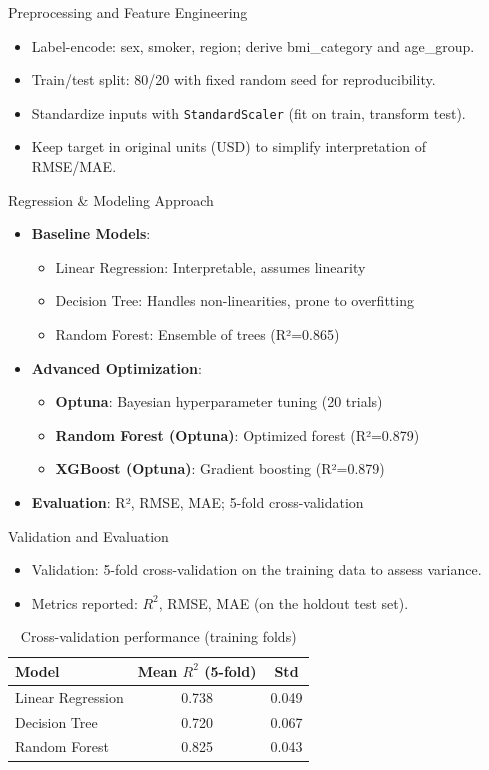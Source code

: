 \documentclass[10pt]{beamer}
\begin{document}
\begin{frame}{Preprocessing and Feature Engineering}
\begin{itemize}
  \item Label-encode: sex, smoker, region; derive bmi\_category and age\_group.
  \item Train/test split: 80/20 with fixed random seed for reproducibility.
  \item Standardize inputs with \texttt{StandardScaler} (fit on train, transform test).
  \item Keep target in original units (USD) to simplify interpretation of RMSE/MAE.
\end{itemize}
\end{frame}

\begin{frame}{Regression \& Modeling Approach}
\begin{itemize}
\item \textbf{Baseline Models}:
  \begin{itemize}
  \item Linear Regression: Interpretable, assumes linearity
  \item Decision Tree: Handles non-linearities, prone to overfitting
  \item Random Forest: Ensemble of trees (R²=0.865)
  \end{itemize}
\item \textbf{Advanced Optimization}:
  \begin{itemize}
  \item \textbf{Optuna}: Bayesian hyperparameter tuning (20 trials)
  \item \textbf{Random Forest (Optuna)}: Optimized forest (R²=0.879)
  \item \textbf{XGBoost (Optuna)}: Gradient boosting (R²=0.879)
  \end{itemize}
\item \textbf{Evaluation}: R², RMSE, MAE; 5-fold cross-validation
\end{itemize}
\end{frame}

\begin{frame}{Validation and Evaluation}
\begin{itemize}
  \item Validation: 5-fold cross-validation on the training data to assess variance.
  \item Metrics reported: $R^2$, RMSE, MAE (on the holdout test set).
\end{itemize}
\vspace{4pt}
\small
\begin{table}[h]
\centering
\begin{tabular}{@{}lcc@{}}
\toprule
Model & Mean $R^2$ (5-fold) & Std \\
\midrule
Linear Regression & 0.738 & 0.049 \\
Decision Tree & 0.720 & 0.067 \\
Random Forest & 0.825 & 0.043 \\
\bottomrule
\end{tabular}
\caption{Cross-validation performance (training folds)}
\end{table}
\end{frame}
\end{document}
